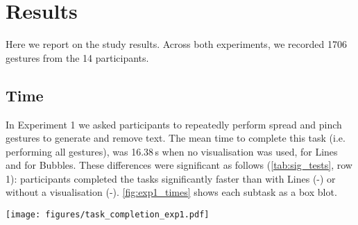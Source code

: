 \section{Results}
Here we report on the study results.
Across both experiments, we recorded 1706 gestures from the 14 participants.

\subsection{Time}
\label{ssec:time}
In Experiment 1 we asked participants to repeatedly perform spread and pinch gestures to generate and remove text.
The mean time to complete this task (i.e. performing all gestures), was 16.38\,s when no visualisation was used,  for Lines and  for Bubbles.
These differences were significant as follows (\cref{tab:sig_tests}, row 1): 
 participants completed the tasks significantly faster than with Lines (-) or without a visualisation (-).
\cref{fig:exp1_times} shows each subtask as a box blot.


\begin{figure*}[t]
    \centering
    \texttt{[image: figures/task\_completion\_exp1.pdf]}
    \caption{Task completion times for all subtasks in Experiment 1, segmented by visualisation condition (NoVis, Line, and Bubbles). Each subtask is represented along the x-axis, with the y-axis showing the completion time in seconds. Box plots display the completion times for each visualisation condition, with individual data points plotted as dots.}
    \label{fig:exp1_times}
\end{figure*}


